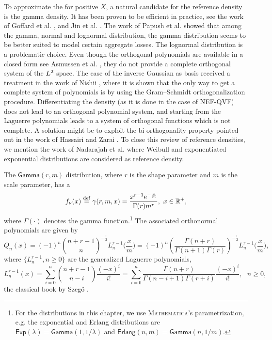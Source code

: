 To approximate the \pdf for positive $X$, a natural candidate for the reference density is the gamma density. It has been proven to be efficient in practice, see the work of Goffard et al. \cite{GoLoPo15,GoLoPo16}, and Jin et al. \cite{JiPrRe16}. The work of Papush et al. \cite{PaPaPo01} showed that among the gamma, normal and lognormal distribution, the gamma distribution seems to be better suited to model certain aggregate losses. The lognormal distribution is a problematic choice. Even though the orthogonal polynomials are available in a closed form see Asmussen et al. \cite{AsGoLa16}, they do not provide a complete orthogonal system of the $L^2$ space. The case of the inverse Gaussian as basis received a treatment in the work of Nishii \cite{Ni96}, where it is shown that the only way to get a complete system of polynomials is by using the Gram--Schmidt orthogonalization procedure. Differentiating the density (as it is done in the case of NEF-QVF) does not lead to an orthogonal polynomial system, and starting from the Laguerre polynomials leads to a system of orthogonal functions which is not complete. A solution might be to exploit the bi-orthogonality property pointed out in the work of Hassairi and Zarai \cite{HaZa04}. To close this review of reference densities, we mention the work of Nadarajah et al. \cite{NaChJi16} where Weibull and exponentiated exponential distributions are considered as reference density.

The $\mathsf{Gamma}(r,m)$ distribution, where $r$ is the shape parameter and $m$ is the scale parameter, has a \pdf
\begin{equation*}\label{eq:PDFGamma}
f_\nu(x)\overset{\mathrm{def}}{=}\gamma(r,m,x)=\frac{x^{r-1}\mathrm{e}^{-\frac{x}{m}}}{\Gamma(r)m^{r}},\text{ }x\in\mathbb{R}^{+},
\end{equation*}
where $\Gamma(\cdot)$ denotes the gamma function.\footnote{For the distributions in this chapter, we use \textsc{Mathematica}'s parametrization, e.g. the exponential and Erlang distributions are $\mathsf{Exp}(\lambda) = \mathsf{Gamma}(1, 1/\lambda)$ and $\mathsf{Erlang}(n, m) = \mathsf{Gamma}(n, 1/m)$.}
The associated orthonormal polynomials are given by
\begin{equation*}\label{eq:GeneralizedLaguerrePolynomials}
Q_{n}(x)
=(-1)^{n} \binom{n + r - 1}{n}^{-\frac12} L_{n}^{r-1}\big(\frac{x}{m}\big)
=(-1)^{n} \left( \frac{\Gamma(n+r)}{\Gamma(n+1)\Gamma(r)} \right)^{-\frac12} L_{n}^{r-1}\big(\frac{x}{m}\big),
\end{equation*}
where $\{L_{n}^{r-1},n\geq0\}$ are the generalized Laguerre polynomials,
\begin{equation*}\label{eq:GeneralizedLaguerrePolynomialsExpression}
L_{n}^{r-1}(x)
=\sum_{i=0}^{n} \binom{n + r - 1}{n - i} \frac{(-x)^i}{i!}
=\sum_{i=0}^{n} \frac{\Gamma(n+r)}{\Gamma(n-i+1)\Gamma(r+i)}\frac{(-x)^i}{i!}, \text{ }n\geq 0,
\end{equation*}
\cf the classical book by Szeg{\"o} \cite{Sz39}. %

